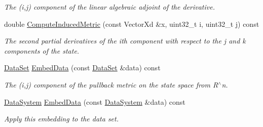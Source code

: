 \begin{DoxyCompactItemize}
\begin{DoxyCompactList}\small\item\em The (i,j) component of the linear algebraic adjoint of the derivative. \end{DoxyCompactList}\item 
\hypertarget{struct_d_r_d_s_p_1_1_embedding_c_w_a7fc6f574011396ef14a775e02fb7ef25}{double \hyperlink{struct_d_r_d_s_p_1_1_embedding_c_w_a7fc6f574011396ef14a775e02fb7ef25}{Compute\-Induced\-Metric} (const Vector\-Xd \&x, uint32\-\_\-t i, uint32\-\_\-t j) const }\label{struct_d_r_d_s_p_1_1_embedding_c_w_a7fc6f574011396ef14a775e02fb7ef25}

\begin{DoxyCompactList}\small\item\em The second partial derivatives of the ith component with respect to the j and k components of the state. \end{DoxyCompactList}\item 
\hypertarget{struct_d_r_d_s_p_1_1_embedding_c_w_ad63dfe0eeab18767684e46cd3000ef83}{\hyperlink{struct_d_r_d_s_p_1_1_data_set}{Data\-Set} \hyperlink{struct_d_r_d_s_p_1_1_embedding_c_w_ad63dfe0eeab18767684e46cd3000ef83}{Embed\-Data} (const \hyperlink{struct_d_r_d_s_p_1_1_data_set}{Data\-Set} \&data) const }\label{struct_d_r_d_s_p_1_1_embedding_c_w_ad63dfe0eeab18767684e46cd3000ef83}

\begin{DoxyCompactList}\small\item\em The (i,j) component of the pullback metric on the state space from R$^\wedge$n. \end{DoxyCompactList}\item 
\hypertarget{struct_d_r_d_s_p_1_1_embedding_c_w_a3ac7659dca082002fef531dd9403ee1f}{\hyperlink{struct_d_r_d_s_p_1_1_data_system}{Data\-System} \hyperlink{struct_d_r_d_s_p_1_1_embedding_c_w_a3ac7659dca082002fef531dd9403ee1f}{Embed\-Data} (const \hyperlink{struct_d_r_d_s_p_1_1_data_system}{Data\-System} \&data) const }\label{struct_d_r_d_s_p_1_1_embedding_c_w_a3ac7659dca082002fef531dd9403ee1f}

\begin{DoxyCompactList}\small\item\em Apply this embedding to the data set. \end{DoxyCompactList}\end{DoxyCompactItemize}
